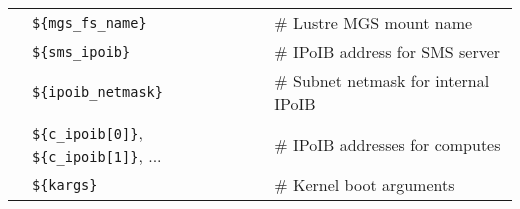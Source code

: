 \vspace*{0.2cm}
\vspace*{0.1cm}

\begin{tabular}{@{}>{\textbullet}l p{7cm} l}
& \texttt{\$\{mgs\_fs\_name\}} & {\small \# Lustre MGS mount name} \\
& \texttt{\$\{sms\_ipoib\}} & {\small \# IPoIB address for SMS server} \\
& \texttt{\$\{ipoib\_netmask\}} & {\small \# Subnet netmask for internal IPoIB} \\
& \texttt{\$\{c\_ipoib[0]\}}, \texttt{\$\{c\_ipoib[1]\}}, ... & {\small \# IPoIB addresses for computes} \\
& \texttt{\$\{kargs\}} & {\small \# Kernel boot arguments} \\  
\end{tabular}



